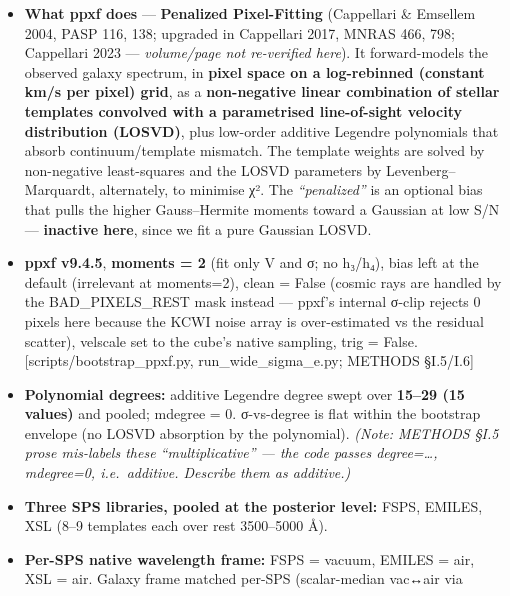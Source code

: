 \documentclass[
]{article}
\providecommand{\tightlist}{%
  \setlength{\itemsep}{0pt}\setlength{\parskip}{0pt}}
\newcommand{\BreakablePath}[1]{{\ttfamily\sloppy #1}}
\begin{document}
\begin{itemize}
\tightlist
\item
  \textbf{What ppxf does} --- \textbf{Penalized Pixel-Fitting}
  (Cappellari \& Emsellem 2004, PASP 116, 138; upgraded in Cappellari
  2017, MNRAS 466, 798; Cappellari 2023 --- \emph{volume/page not
  re-verified here}). It forward-models the observed galaxy spectrum, in
  \textbf{pixel space on a log-rebinned (constant km/s per pixel) grid},
  as a \textbf{non-negative linear combination of stellar templates
  convolved with a parametrised line-of-sight velocity distribution
  (LOSVD)}, plus low-order additive Legendre polynomials that absorb
  continuum/template mismatch. The template weights are solved by
  non-negative least-squares and the LOSVD parameters by
  Levenberg--Marquardt, alternately, to minimise χ². The
  \emph{``penalized''} is an optional bias that pulls the higher
  Gauss--Hermite moments toward a Gaussian at low S/N ---
  \textbf{inactive here}, since we fit a pure Gaussian LOSVD.
\item
  \textbf{ppxf v9.4.5}, \textbf{\BreakablePath{moments = 2}} (fit only V
  and σ; no h₃/h₄), \BreakablePath{bias} left at the default (irrelevant
  at moments=2), \BreakablePath{clean = False} (cosmic rays are handled
  by the
  \BreakablePath{BAD\_\discretionary{}{}{}PIXELS\_\discretionary{}{}{}REST}
  mask instead --- ppxf's internal σ-clip rejects 0 pixels here because
  the KCWI noise array is over-estimated vs the residual scatter),
  \BreakablePath{velscale} set to the cube's native sampling,
  \BreakablePath{trig = False}. {[}scripts/bootstrap\_ppxf.py,
  \BreakablePath{run\_\discretionary{}{}{}wide\_\discretionary{}{}{}sigma\_\discretionary{}{}{}e.\discretionary{}{}{}py};
  METHODS §I.5/I.6{]}
\item
  \textbf{Polynomial degrees:} additive Legendre \BreakablePath{degree}
  swept over \textbf{15--29 (15 values)} and pooled;
  \BreakablePath{mdegree = 0}. σ-vs-degree is flat within the bootstrap
  envelope (no LOSVD absorption by the polynomial). \emph{(Note: METHODS
  §I.5 prose mis-labels these ``multiplicative'' --- the code passes
  \BreakablePath{degree=…, mdegree=0}, i.e.~additive. Describe them as
  additive.)}
\item
  \textbf{Three SPS libraries, pooled at the posterior level:} FSPS,
  EMILES, XSL (8--9 templates each over rest 3500--5000 Å).
\item
  \textbf{Per-SPS native wavelength frame:} FSPS = vacuum, EMILES = air,
  XSL = air. Galaxy frame matched per-SPS (scalar-median vac↔air via

\end{itemize}
\end{document}
